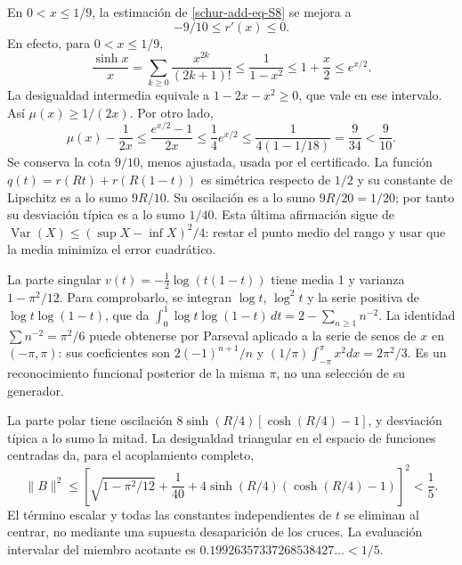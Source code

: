 En \(0<x\leq1/9\), la estimación de \eqref{schur-add-eq-S8} se mejora a
\begin{equation}
-9/10\leq r'(x)\leq0.
\label{schur-add-display-25}
\end{equation}
En efecto, para \(0<x\leq1/9\),
\begin{equation}
\frac{\sinh x}{x}
=\sum_{k\geq0}\frac{x^{2k}}{(2k+1)!}
\leq\frac1{1-x^2}\leq1+\frac x2\leq e^{x/2}.
\label{schur-add-display-26}
\end{equation}
La desigualdad intermedia equivale a \(1-2x-x^2\geq0\),
que vale en ese intervalo. Así \(\mu(x)\geq1/(2x)\).
Por otro lado,
\begin{equation}
\mu(x)-\frac1{2x}\leq\frac{e^{x/2}-1}{2x}
\leq\frac14 e^{x/2}
\leq\frac1{4(1-1/18)}=\frac9{34}<\frac9{10}.
\label{schur-add-display-27}
\end{equation}
Se conserva la cota \(9/10\), menos ajustada, usada por el certificado.
La función \(q(t)=r(Rt)+r(R(1-t))\) es simétrica respecto de
\(1/2\) y su constante de Lipschitz es a lo sumo \(9R/10\).
Su oscilación es a lo sumo \(9R/20=1/20\); por tanto su desviación
típica es a lo sumo \(1/40\). Esta última afirmación sigue de
\(\operatorname{Var}(X)\leq(\sup X-\inf X)^2/4\): restar el
punto medio del rango y usar que la media minimiza el error cuadrático.

La parte singular \(v(t)=-\tfrac12\log(t(1-t))\) tiene media 1 y
varianza \(1-\pi^2/12\). Para comprobarlo, se integran
\(\log t\), \(\log^2t\) y la serie positiva de
\(\log t\log(1-t)\), que da
\(\int_0^1\log t\log(1-t)\,dt=2-\sum_{n\geq1}n^{-2}\).
La identidad \(\sum n^{-2}=\pi^2/6\) puede obtenerse por Parseval
aplicado a la serie de senos de \(x\) en \((-\pi,\pi)\): sus
coeficientes son \(2(-1)^{n+1}/n\) y
\((1/\pi)\int_{-\pi}^{\pi}x^2dx=2\pi^2/3\). Es un reconocimiento
funcional posterior de la misma \(\pi\), no una selección de su generador.

La parte polar tiene oscilación
\(8\sinh(R/4)[\cosh(R/4)-1]\), y desviación típica a lo sumo
la mitad. La desigualdad triangular en el espacio de funciones
centradas da, para el acoplamiento completo,
\begin{equation}
\boxed{\|B\|^2\leq
\left[\sqrt{1-\pi^2/12}+\frac1{40}
+4\sinh(R/4)(\cosh(R/4)-1)\right]^2<\frac15.}
\label{schur-add-eq-S12}
\end{equation}
El término escalar y todas las constantes independientes de \(t\)
se eliminan al centrar, no mediante una supuesta desaparición de los
cruces. La evaluación intervalar del miembro acotante es
\(0.19926357337268538427\ldots<1/5\).

